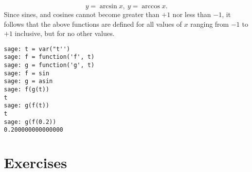 \begin{equation}
  y = \arcsin x,\ y = \arccos x.
  \label{eqn:02:04}
\end{equation}
Since sines, and cosines cannot become greater than $+1$ nor less than $-1$, it
follows that the above functions are defined for all values of $x$ ranging from
$-1$ to $+1$ inclusive, but for no other values.

\begin{Verbatim}[fontsize=\scriptsize,fontfamily=courier,fontshape=tt,frame=single,label=\SAGE]
sage: t = var("t'')
sage: f = function('f', t)
sage: g = function('g', t)
sage: f = sin
sage: g = asin
sage: f(g(t))
t
sage: g(f(t))
t
sage: g(f(0.2))
0.200000000000000
\end{Verbatim}

\section{Exercises}
\label{sec:02:08}

